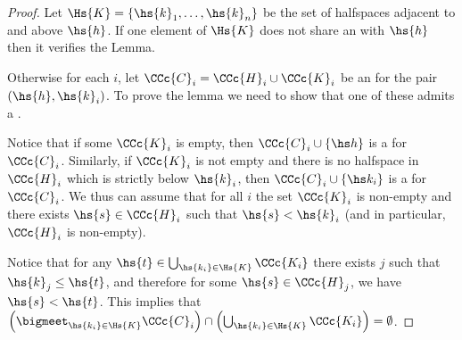 \begin{proof}

Let $\Hs{K} = \left\{\hs{k}_1,\dots, \hs{k}_n\right\}$ be the set of halfspaces adjacent to and above $\hs{h}$.
If one element of $\Hs{K}$ does not share an \intc with $\hs{h}$ then it verifies the Lemma.

Otherwise for each $i$, let $\CCc{C}_i = \CCc{H}_i \cup \CCc{K}_i$ be an \intc for the pair $(\hs{h},\hs{k}_i)$. To prove the lemma we need to show that one of these \intcs admits a \countc.

Notice that if some $\CCc{K}_i$ is empty, then $\CCc{C}_i\cup \left\{\hs h\right\}$ is a \countc for $\CCc{C}_i$. Similarly, if $\CCc{K}_i$ is not empty and there is no halfspace in $\CCc{H}_i$ which is strictly below $\hs{k}_i$, then $\CCc{C}_i\cup \left\{\hs k_i\right\}$ is a \countc for $\CCc{C}_i$. We thus can assume that for all $i$ the set $\CCc{K}_i$ is non-empty and there exists $\hs{s}\in\CCc{H}_i$ such that $\hs{s}<\hs{k}_i$ (and in particular, $\CCc{H}_i$ is non-empty).

Notice that for any $\hs{t} \in \bigcup_{\hs{k_i} \in \Hs{K}}\CCc{K_i}$ there exists $j$ such that $\hs{k}_j \leq \hs{t}$, and therefore for some $\hs{s} \in \CCc{H}_j$, we have $\hs{s} < \hs{t}$. This implies that $\left(\bigmeet_{\hs{k_i} \in \Hs{K}}\CCc{C}_i\right)\cap\left(\bigcup_{\hs{k_i} \in \Hs{K}}\CCc{K_i}\right) = \emptyset$.


\end{proof}

